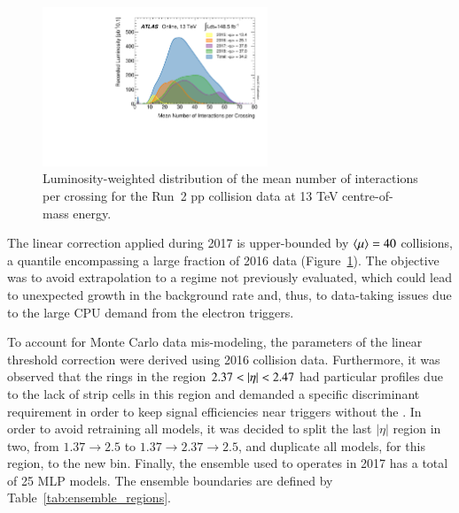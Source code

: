 



%
%



\begin{figure}[h!t]
\centering
\includegraphics[width=0.6\textwidth]{sections/03_ringer/figures/mu_2015_2018.pdf}
\caption{\label{fig:mu_2015_2018}
Luminosity-weighted distribution of the mean number of interactions per crossing
for the Run~2 pp collision data at 13 TeV centre-of-mass
energy.~\cite{atlas_lumi_run2_results}}
\end{figure}


The linear correction applied during 2017 is upper-bounded by $\langle \mu \rangle=40$
collisions, a quantile encompassing a large fraction of 2016 data
(Figure~\ref{fig:mu_2015_2018}). The objective was to avoid extrapolation to a
regime not previously evaluated, which could lead to unexpected growth in the
background rate and, thus, to data-taking issues due to the large CPU demand
from the electron triggers.

To account for Monte Carlo data mis-modeling, the parameters of the linear threshold
correction were derived using 2016 collision data. Furthermore, it was observed
that the rings in the region $2.37<\abseta<2.47$ had particular profiles due to
the lack of strip cells in this region and demanded a specific discriminant requirement in order to keep signal efficiencies near triggers without the \rnn{}. In order to avoid retraining all models, it was decided to split the last $|\eta|$ region in two, from $1.37\rightarrow 2.5$ to $1.37\rightarrow2.37\rightarrow2.5$, and duplicate all models, for this region, to the new bin. Finally, the ensemble used to operates in 2017 has a total of 25 MLP models. The ensemble boundaries are defined by Table~\ref{tab:ensemble_regions}.

